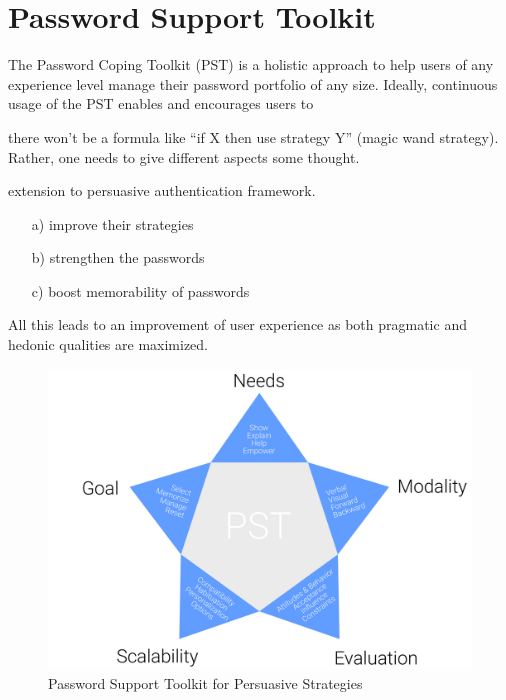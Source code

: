 
\chapter[Password Support Toolkit]{Password Support Toolkit}\label{chap:pct_intro}
The Password Coping Toolkit (PST) is a holistic approach to help users of any experience level manage their password portfolio of any size. Ideally, continuous usage of the PST enables and encourages users to 

there won't be a formula like ``if X then use strategy Y'' (magic wand strategy). Rather, one needs to give different aspects some thought. 





extension to persuasive authentication framework. 

\begin{enumerate}
\item[a)] improve their strategies
\item[b)] strengthen the passwords
\item[c)] boost memorability of passwords
\end{enumerate}

All this leads to an improvement of user experience as both pragmatic and hedonic qualities are maximized. 



\begin{figure}
	\centering
	\includegraphics[width=0.8\linewidth]{figures/pst/PST-Star}
	\caption{\label{fig:pst:pst-star} Password Support Toolkit for Persuasive Strategies}
\end{figure}


